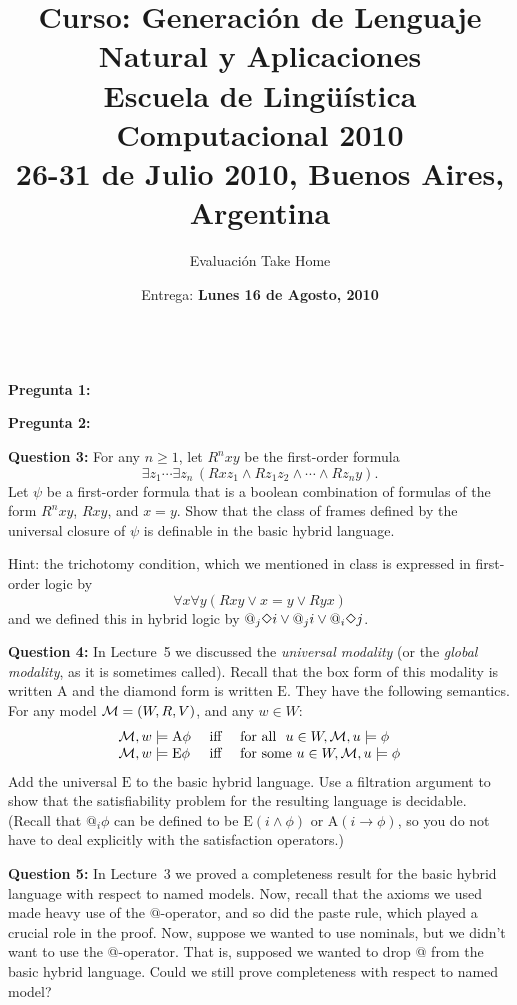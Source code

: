 \documentclass{article}
\title{\textsf{Curso: Generaci\'on de Lenguaje Natural y Aplicaciones}\\
Escuela de Ling\"u\'istica Computacional 2010 \\
26-31 de Julio 2010, Buenos Aires, Argentina\\
}
\author{Evaluaci\'on Take Home}
\date{Entrega: \textbf{Lunes 16 de Agosto, 2010}\\
\mbox{    } }
\def\at#1#2{{\char64}_{#1}#2}
\def\forces{\models}
\def\univ{\mathrm{E}}
\def\Univ{\mathrm{A}}
\begin{document}
\maketitle



\textbf{Pregunta 1: } 


\medskip
\textbf{Pregunta 2: } 


\medskip
\textbf{Question 3: } 
For any $n\ge 1$, let $R^{n}xy$ be the first-order formula $$\exists
z_{1}\cdots \exists z_{n}\,(Rxz_{1}\wedge Rz_{1}z_{2} \wedge \cdots
\wedge Rz_{n}y).$$  Let $\psi$ be a first-order formula that is a
boolean combination of formulas of the form $R^{n}xy$, $Rxy$, and
$x=y$.  Show that the class of frames defined by the universal 
closure
of $\psi$ is definable in the basic hybrid language.

Hint: the trichotomy condition, which we mentioned in class is
expressed in first-order logic by
$$\forall x \forall y (Rxy \vee x=y \vee Ryx)$$
and we defined this in hybrid logic
by
$\at{j}{\Diamond i} \vee \at{j}{i} \vee \at{i}{\Diamond j} $.


\medskip


\medskip
\textbf{Question 4: } 
In Lecture~5 we discussed the \textit{universal modality} (or the
\textit{global modality}, as it is sometimes called). Recall that the
box form of this modality is written $\Univ$ and the diamond form is
written $\univ$. They have the following semantics. For any model
${\cal M} = (W,R,V)$, and any $w\in W$:
$$\begin{array}{lcl}
{\cal M},w \forces \Univ\phi & \ \mbox{iff} \ & \mbox{for all \ } u\in W,
{\cal M},u \forces \phi \\

{\cal M},w \forces \univ\phi & \ \mbox{iff} \ & \mbox{for some\ } u\in W,
{\cal M},u \forces \phi \\
\end{array}$$
Add the universal $\univ$ to the basic hybrid language.  Use a
filtration argument to show that the satisfiability problem for the
resulting language is decidable.  (Recall that $@_{i}\phi$ can be
defined to be $\univ(i\wedge \phi)$ or $\Univ(i\rightarrow \phi)$, so
you do not have to deal explicitly with the satisfaction operators.)

\medskip
\textbf{Question 5: } 
In Lecture~3 we proved a completeness result for the basic hybrid
language with respect to named models. Now, recall that the axioms we
used made heavy use of the $@$-operator, and so did the {\sc paste\/}
rule, which played a crucial role in the proof.  Now, suppose we
wanted to use nominals, but we didn't want to use the @-operator. That
is, supposed we wanted to drop @ from the basic hybrid language. Could
we still prove completeness with respect to named model?
\end{document}
